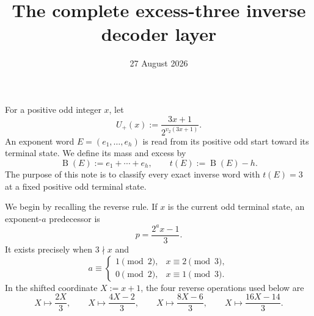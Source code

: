\documentclass[11pt]{article}
\title{The complete excess-three inverse decoder layer}
\author{}
\date{27 August 2026}
\newcommand{\Up}{U_+}
\newcommand{\mass}{\operatorname{B}}
\begin{document}
\raggedbottom
\maketitle

For a positive odd integer $x$, let
\[
 \Up(x):=\frac{3x+1}{2^{v_2(3x+1)}}.
 \tag{1}
\]
An exponent word $E=(e_1,\ldots,e_h)$ is read from its positive odd
start toward its terminal state.  We define its mass and excess by
\[
 \mass(E):=e_1+\cdots+e_h,
 \qquad t(E):=\mass(E)-h.
 \tag{2}
\]
The purpose of this note is to classify every exact inverse word with
$t(E)=3$ at a fixed positive odd terminal state.

We begin by recalling the reverse rule.  If $x$ is the current odd
terminal state, an exponent-$a$ predecessor is
\[
 p=\frac{2^a x-1}{3}.
 \tag{3}
\]
It exists precisely when $3\nmid x$ and
\[
 a\equiv
 \begin{cases}
 1\pmod2,&x\equiv2\pmod3,\\
 0\pmod2,&x\equiv1\pmod3.
 \end{cases}
 \tag{4}
\]
In the shifted coordinate $X:=x+1$, the four reverse operations used
below are
\[
 X\longmapsto\frac{2X}{3},
 \qquad
 X\longmapsto\frac{4X-2}{3},
 \qquad
 X\longmapsto\frac{8X-6}{3},
 \qquad
 X\longmapsto\frac{16X-14}{3}.
 \tag{5}
\]
\end{document}
